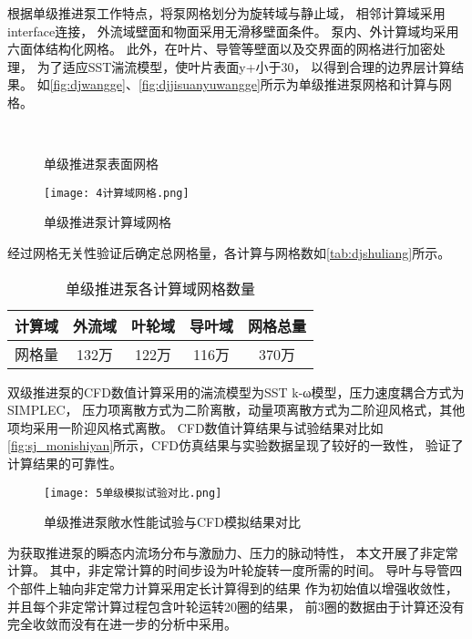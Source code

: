 根据单级推进泵工作特点，将泵网格划分为旋转域与静止域，
相邻计算域采用interface连接，
外流域壁面和物面采用无滑移壁面条件。
泵内、外计算域均采用六面体结构化网格。
此外，在叶片、导管等壁面以及交界面的网格进行加密处理，
为了适应SST湍流模型，使叶片表面y+小于30，
以得到合理的边界层计算结果。
如\autoref{fig:djwangge}、\autoref{fig:djjisuanyuwangge}所示为单级推进泵网格和计算与网格。
\begin{figure}[htbp]
    \centering
    \vspace{0.02cm}
    \caption{\label{fig:djwangge}单级推进泵表面网格}
\end{figure}

\begin{figure}[htbp]
    \centering
    \texttt{[image: 4计算域网格.png]}
    \caption{\label{fig:djjisuanyuwangge}单级推进泵计算域网格}
\end{figure}

经过网格无关性验证后确定总网格量，各计算与网格数如\autoref{tab:djshuliang}所示。
\begin{table}[htbp]
    \centering
    \caption{\label{tab:djshuliang}单级推进泵各计算域网格数量}
    \begin{tabular}{ccccc}
        \toprule
        计算域 & 外流域 & 叶轮域 & 导叶域  & 网格总量 \\
        \midrule
        网格量 & 132万 & 122万 & 116万 & 370万 \\
        \bottomrule
    \end{tabular}
\end{table}

双级推进泵的CFD数值计算采用的湍流模型为SST k-ω模型，压力速度耦合方式为SIMPLEC，
压力项离散方式为二阶离散，动量项离散方式为二阶迎风格式，其他项均采用一阶迎风格式离散。
CFD数值计算结果与试验结果对比如\autoref{fig:sj_monishiyan}所示，CFD仿真结果与实验数据呈现了较好的一致性，
验证了计算结果的可靠性。
\begin{figure}[htbp]
    \centering
    \texttt{[image: 5单级模拟试验对比.png]}
    \caption{\label{fig:sj_monishiyan}单级推进泵敞水性能试验与CFD模拟结果对比}
\end{figure}

为获取推进泵的瞬态内流场分布与激励力、压力的脉动特性，
本文开展了非定常计算。
其中，非定常计算的时间步设为叶轮旋转一度所需的时间。
导叶与导管四个部件上轴向非定常力计算采用定长计算得到的结果
作为初始值以增强收敛性，并且每个非定常计算过程包含叶轮运转20圈的结果，
前3圈的数据由于计算还没有完全收敛而没有在进一步的分析中采用。
